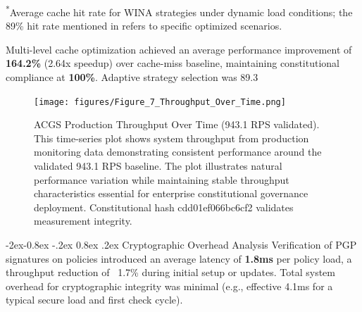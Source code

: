 \documentclass[manuscript,screen,9pt]{acmart}
\makeatletter
\renewcommand\subsubsection{\@startsection{subsubsection}{3}{\z@}%
  {-2ex\@plus -0.8ex \@minus -.2ex}%
  {0.8ex \@plus .2ex}%
  {\normalfont\normalsize\bfseries}}
\makeatother
\begin{document}
\begin{table}[htbp]
	\begin{minipage}{\linewidth}\footnotesize \textsuperscript{*}Average cache hit rate for WINA strategies under dynamic load conditions; the 89\% hit rate mentioned in  refers to specific optimized scenarios.\end{minipage}
\end{table}
Multi-level cache optimization achieved an average performance improvement of \textbf{164.2\%} (2.64x speedup) over cache-miss baseline, maintaining constitutional compliance at \textbf{100\%}. Adaptive strategy selection was 89.3%

\FloatBarrier %
\begin{figure}[!htb]
	\centering
	\texttt{[image: figures/Figure\_7\_Throughput\_Over\_Time.png]}
	\caption[ACGS Production Throughput Over Time]{ACGS Production Throughput Over Time (943.1 RPS validated). This time-series plot shows system throughput from production monitoring data demonstrating consistent performance around the validated 943.1 RPS baseline. The plot illustrates natural performance variation while maintaining stable throughput characteristics essential for enterprise constitutional governance deployment. Constitutional hash cdd01ef066bc6cf2\cite{perf-report} validates measurement integrity.}
	\label{fig:throughput_over_time}
\end{figure}

\subsubsection{Cryptographic Overhead Analysis}
\label{subsubsec:cryptographic_overhead}
Verification of PGP signatures on policies introduced an average latency of \textbf{1.8ms} per policy load, a throughput reduction of ~1.7\% during initial setup or updates. Total system overhead for cryptographic integrity was minimal (e.g., effective 4.1ms for a typical secure load and first check cycle).
\end{document}
